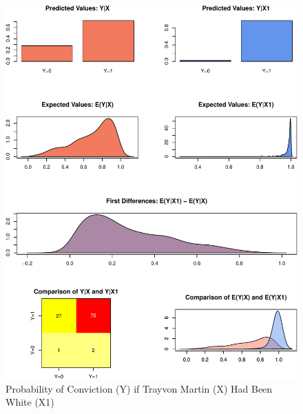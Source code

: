 \documentclass[12pt,article]{article}
\begin{document}
\begin{figure}[htbp]
\centering
\includegraphics{stand_your_ground_article_files/figure-latex/unnamed-chunk-7.pdf}
\caption{Probability of Conviction (Y) if Trayvon Martin (X) Had Been
White (X1)}
\end{figure}
\end{document}
